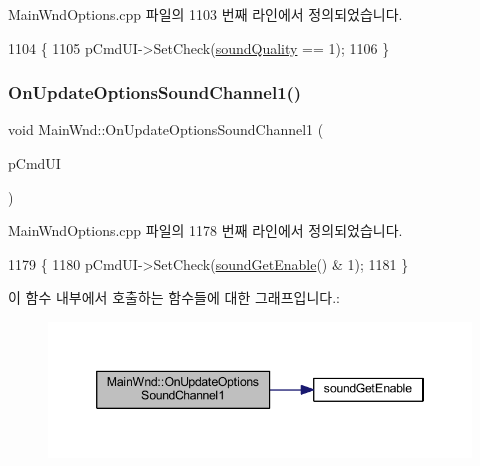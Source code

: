 Main\+Wnd\+Options.\+cpp 파일의 1103 번째 라인에서 정의되었습니다.


\begin{DoxyCode}
1104 \{
1105   pCmdUI->SetCheck(\mbox{\hyperlink{gb_sound_8cpp_aaeaa156dcc7083863fa6554b8e14854a}{soundQuality}} == 1);
1106 \}
\end{DoxyCode}
\mbox{\label{class_main_wnd_a1609087341107ba7ef7ff37757cc307b}} 
\subsubsection{\texorpdfstring{On\+Update\+Options\+Sound\+Channel1()}{OnUpdateOptionsSoundChannel1()}}
{\footnotesize\ttfamily void Main\+Wnd\+::\+On\+Update\+Options\+Sound\+Channel1 (\begin{DoxyParamCaption}\item[{C\+Cmd\+UI $\ast$}]{p\+Cmd\+UI }\end{DoxyParamCaption})\hspace{0.3cm}{\ttfamily [protected]}}



Main\+Wnd\+Options.\+cpp 파일의 1178 번째 라인에서 정의되었습니다.


\begin{DoxyCode}
1179 \{
1180   pCmdUI->SetCheck(\mbox{\hyperlink{_sound_8cpp_a3d1f6129176583804274bb162c3428a8}{soundGetEnable}}() & 1);
1181 \}
\end{DoxyCode}
이 함수 내부에서 호출하는 함수들에 대한 그래프입니다.\+:
\nopagebreak
\begin{figure}[H]
\begin{center}
\leavevmode
\includegraphics[width=346pt]{class_main_wnd_a1609087341107ba7ef7ff37757cc307b_cgraph}
\end{center}
\end{figure}
\mbox{\label{class_main_wnd_a23b93b9a81b78b2c0107df90b7df6510}} 
